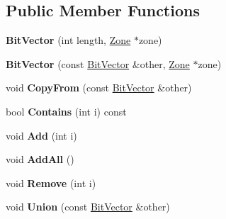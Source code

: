 \subsection*{Public Member Functions}
\begin{DoxyCompactItemize}
\item 
{\bfseries Bit\+Vector} (int length, \hyperlink{classv8_1_1internal_1_1_zone}{Zone} $\ast$zone)\hypertarget{classv8_1_1internal_1_1_bit_vector_af544ed726491e87d70f462496b19d05f}{}\label{classv8_1_1internal_1_1_bit_vector_af544ed726491e87d70f462496b19d05f}

\item 
{\bfseries Bit\+Vector} (const \hyperlink{classv8_1_1internal_1_1_bit_vector}{Bit\+Vector} \&other, \hyperlink{classv8_1_1internal_1_1_zone}{Zone} $\ast$zone)\hypertarget{classv8_1_1internal_1_1_bit_vector_a8d67c80e211724af1a7e869c7c635762}{}\label{classv8_1_1internal_1_1_bit_vector_a8d67c80e211724af1a7e869c7c635762}

\item 
void {\bfseries Copy\+From} (const \hyperlink{classv8_1_1internal_1_1_bit_vector}{Bit\+Vector} \&other)\hypertarget{classv8_1_1internal_1_1_bit_vector_a5494f246d07fa844a5e56a06c56bc036}{}\label{classv8_1_1internal_1_1_bit_vector_a5494f246d07fa844a5e56a06c56bc036}

\item 
bool {\bfseries Contains} (int i) const \hypertarget{classv8_1_1internal_1_1_bit_vector_a25e5f17e7d35dd555c3d31661ae4d653}{}\label{classv8_1_1internal_1_1_bit_vector_a25e5f17e7d35dd555c3d31661ae4d653}

\item 
void {\bfseries Add} (int i)\hypertarget{classv8_1_1internal_1_1_bit_vector_a4446fcb95f6c07eee24b939ad888d77a}{}\label{classv8_1_1internal_1_1_bit_vector_a4446fcb95f6c07eee24b939ad888d77a}

\item 
void {\bfseries Add\+All} ()\hypertarget{classv8_1_1internal_1_1_bit_vector_a9b626acb987feb2d6c3712c79923e711}{}\label{classv8_1_1internal_1_1_bit_vector_a9b626acb987feb2d6c3712c79923e711}

\item 
void {\bfseries Remove} (int i)\hypertarget{classv8_1_1internal_1_1_bit_vector_a15eb481a0e248448c21c6f6d3ddd3904}{}\label{classv8_1_1internal_1_1_bit_vector_a15eb481a0e248448c21c6f6d3ddd3904}

\item 
void {\bfseries Union} (const \hyperlink{classv8_1_1internal_1_1_bit_vector}{Bit\+Vector} \&other)\hypertarget{classv8_1_1internal_1_1_bit_vector_ab583aee18185d9c0f683943e19a2150f}{}\label{classv8_1_1internal_1_1_bit_vector_ab583aee18185d9c0f683943e19a2150f}


\end{DoxyCompactItemize}
